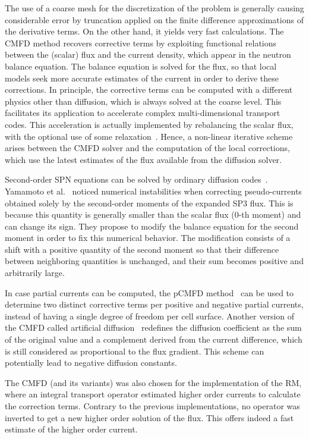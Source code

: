 \documentclass[letterpaper]{physor2020}
\begin{document}
The use of a coarse mesh for the discretization of the problem is generally causing considerable error by truncation applied on the finite difference approximations of the derivative terms. On the other hand, it yields very fast calculations. The CMFD method recovers corrective terms by exploiting functional relations between the (scalar) flux and the current density, which appear in the neutron balance equation. The balance equation is solved for the flux, so that local models seek more accurate estimates of the current in order to derive these corrections. In principle, the corrective terms can be computed with a different physics other than diffusion, which is always solved at the coarse level. This facilitates its application to accelerate complex multi-dimensional transport codes. This acceleration is actually implemented by rebalancing the scalar flux, with the optional use of some relaxation~\cite{Park-2017}. Hence, a non-linear iterative scheme arises between the CMFD solver and the computation of the local corrections, which use the latest estimates of the flux available from the diffusion solver.

Second-order SPN equations can be solved by ordinary diffusion codes~\cite{Larsen-1993}. Yamamoto et al.~\cite{Yamamoto-2016} noticed numerical instabilities when correcting pseudo-currents obtained solely by the second-order moments of the expanded SP3 flux. This is because this quantity is generally smaller than the scalar flux (0-th moment) and can change its sign. They propose to modify the balance equation for the second moment in order to fix this numerical behavior. The modification consists of a shift with a positive quantity of the second moment so that their difference between neighboring quantities is unchanged, and their sum becomes positive and arbitrarily large.

In case partial currents can be computed, the pCMFD method~\cite{Cho-2003} can be used to determine two distinct corrective terms per positive and negative partial currents, instead of having a single degree of freedom per cell surface. Another version of the CMFD called artificial diffusion~\cite{Zhu-2016,Jarrett-2016} redefines the diffusion coefficient as the sum of the original value and a complement derived from the current difference, which is still considered as proportional to the flux gradient. This scheme can potentially lead to negative diffusion constants.

The CMFD (and its variants) was also chosen for the implementation of the RM, where an integral transport operator estimated higher order currents to calculate the correction terms. Contrary to the previous implementations, no operator was inverted to get a new higher order solution of the flux. This offers indeed a fast estimate of the higher order current.
\end{document}
